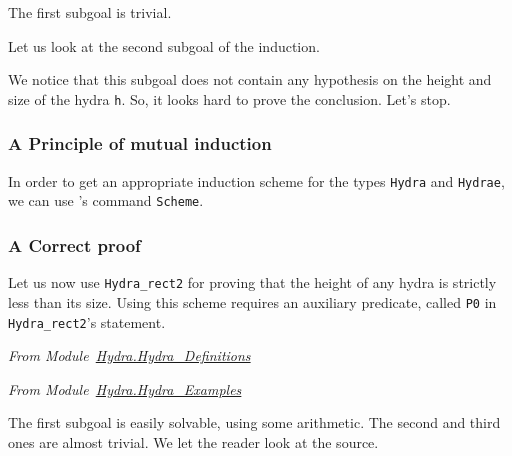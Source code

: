The first subgoal is trivial.



Let us look at the second subgoal of the induction.



We notice that this subgoal does not contain any hypothesis
on the height and size of the hydra \texttt{h}. So, it looks hard to prove the conclusion. Let's stop.



\subsubsection{A Principle of mutual induction}
In order to get an appropriate induction scheme for the types 
\texttt{Hydra} and \texttt{Hydrae}, we can use  \coq{}'s  command \texttt{Scheme}.











\subsubsection{A Correct proof}

Let us now use \texttt{Hydra\_rect2} for proving that the height of any hydra is strictly less than its size.
Using this scheme requires an auxiliary predicate, called \texttt{P0} in \texttt{Hydra\_rect2}'s statement. 

\vspace{4pt}
\noindent
\emph{From Module~\href{../theories/html/hydras.Hydra.Hydra_Definitions.html}{Hydra.Hydra\_Definitions}}



\emph{From Module~\href{../theories/html/hydras.Hydra.Hydra_Examples.html}{Hydra.Hydra\_Examples}}





The first subgoal is easily solvable, using some arithmetic.
The second and third ones are
almost trivial. We let the reader look at the source. 




